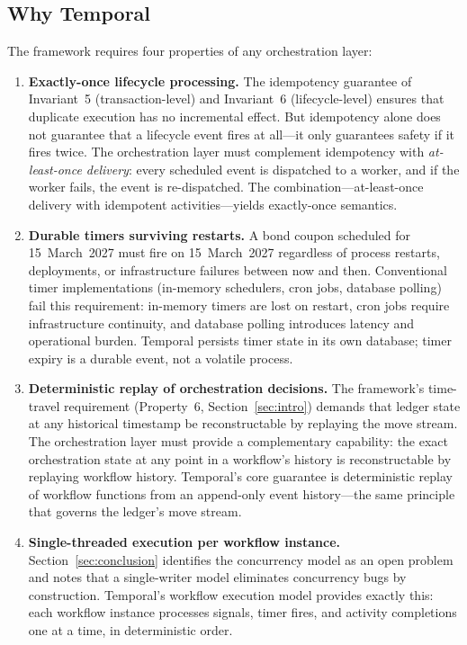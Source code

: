 \documentclass[11pt,a4paper]{article}
\begin{document}
\subsection{Why Temporal}
\label{sec:temporal-why}

The framework requires four properties of any orchestration layer:

\begin{enumerate}[nosep]
\item \textbf{Exactly-once lifecycle processing.} The idempotency guarantee of Invariant~5 (transaction-level) and Invariant~6 (lifecycle-level) ensures that duplicate execution has no incremental effect. But idempotency alone does not guarantee that a lifecycle event fires at all---it only guarantees safety if it fires twice. The orchestration layer must complement idempotency with \emph{at-least-once delivery}: every scheduled event is dispatched to a worker, and if the worker fails, the event is re-dispatched. The combination---at-least-once delivery with idempotent activities---yields exactly-once semantics.

\item \textbf{Durable timers surviving restarts.} A bond coupon scheduled for 15~March~2027 must fire on 15~March~2027 regardless of process restarts, deployments, or infrastructure failures between now and then. Conventional timer implementations (in-memory schedulers, cron jobs, database polling) fail this requirement: in-memory timers are lost on restart, cron jobs require infrastructure continuity, and database polling introduces latency and operational burden. Temporal persists timer state in its own database; timer expiry is a durable event, not a volatile process.

\item \textbf{Deterministic replay of orchestration decisions.} The framework's time-travel requirement (Property~6, Section~\ref{sec:intro}) demands that ledger state at any historical timestamp be reconstructable by replaying the move stream. The orchestration layer must provide a complementary capability: the exact orchestration state at any point in a workflow's history is reconstructable by replaying workflow history. Temporal's core guarantee is deterministic replay of workflow functions from an append-only event history---the same principle that governs the ledger's move stream.

\item \textbf{Single-threaded execution per workflow instance.} Section~\ref{sec:conclusion} identifies the concurrency model as an open problem and notes that a single-writer model eliminates concurrency bugs by construction. Temporal's workflow execution model provides exactly this: each workflow instance processes signals, timer fires, and activity completions one at a time, in deterministic order.
\end{enumerate}
\end{document}
